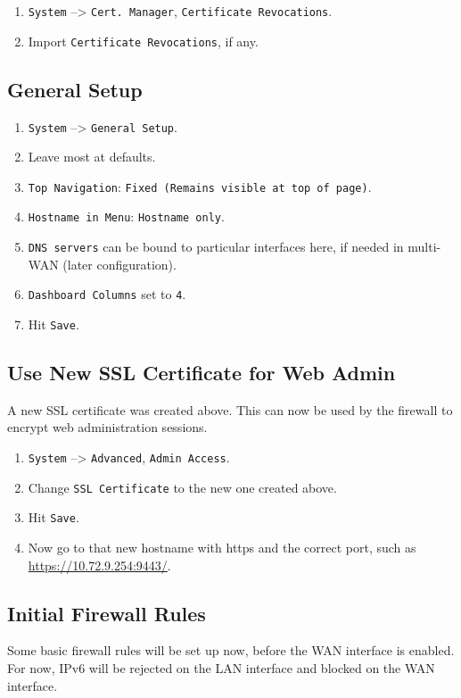 \begin{enumerate}
 \item \texttt{System} --> \texttt{Cert. Manager}, \texttt{Certificate Revocations}.
 \item Import \texttt{Certificate Revocations}, if any.
\end{enumerate}

\subsection{General Setup}
\begin{enumerate}
 \item \texttt{System} --> \texttt{General Setup}.
 \item Leave most at defaults.
 \item \texttt{Top Navigation}: \texttt{Fixed (Remains visible at top of page)}.
 \item \texttt{Hostname in Menu}: \texttt{Hostname only}.
 \item \texttt{DNS servers} can be bound to particular interfaces here, if needed in multi-WAN (later configuration).
 \item \texttt{Dashboard Columns} set to \texttt{4}.
 \item Hit \texttt{Save}.
\end{enumerate}

\subsection{Use New SSL Certificate for Web Admin}
A new SSL certificate was created above. This can now be used by the firewall to encrypt web administration sessions.

\begin{enumerate}
 \item \texttt{System} --> \texttt{Advanced}, \texttt{Admin Access}.
 \item Change \texttt{SSL Certificate} to the new one created above.
 \item Hit \texttt{Save}.
 \item Now go to that new hostname with https and the correct port, such as \url{https://10.72.9.254:9443/}.
\end{enumerate}

\subsection{Initial Firewall Rules}
Some basic firewall rules will be set up now, before the WAN interface is enabled.
For now, IPv6 will be rejected on the LAN interface and blocked on the WAN interface.


